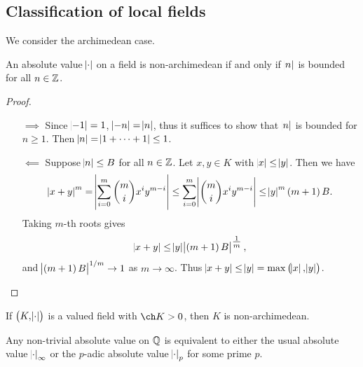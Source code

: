 \subsection{Classification of local fields}

We consider the archimedean case.

\begin{lemma}
\label{lem:9.3}
An absolute value $ \abs{\cdot} $ on a field is non-archimedean if and only if $ \abs{n} $ is bounded for all $ n \in \mathbb{Z} $.
\end{lemma}

\begin{proof}
\hfill
\begin{itemize}
\item[$ \implies $] Since $ \abs{-1} = 1 $, $ \abs{-n} = \abs{n} $, thus it suffices to show that $ \abs{n} $ is bounded for $ n \ge 1 $. Then $ \abs{n} = \abs{1 + \dots + 1} \le 1 $.
\item[$ \impliedby $] Suppose $ \abs{n} \le B $ for all $ n \in \mathbb{Z} $. Let $ x, y \in K $ with $ \abs{x} \le \abs{y} $. Then we have
$$ \abs{x + y}^m = \abs{\sum_{i = 0}^m \binom{m}{i}x^iy^{m - i}} \le \sum_{i = 0}^m \abs{\binom{m}{i}x^iy^{m - i}} \le \abs{y}^m\br{m + 1}B. $$
Taking $ m $-th roots gives
$$ \abs{x + y} \le \abs{y}\abs{\br{m + 1}B}^{\tfrac{1}{m}}, $$
and $ \abs{\br{m + 1}B}^{1 / m} \to 1 $ as $ m \to \infty $. Thus $ \abs{x + y} \le \abs{y} = \max\br{\abs{x}, \abs{y}} $.
\end{itemize}
\end{proof}

\begin{corollary}
\label{cor:9.4}
If $ \br{K, \abs{\cdot}} $ is a valued field with $ \ch K > 0 $, then $ K $ is non-archimedean.
\end{corollary}

\begin{theorem}
Any non-trivial absolute value on $ \mathbb{Q} $ is equivalent to either the usual absolute value $ \abs{\cdot}_\infty $ or the $ p $-adic absolute value $ \abs{\cdot}_p $ for some prime $ p $.
\end{theorem}

